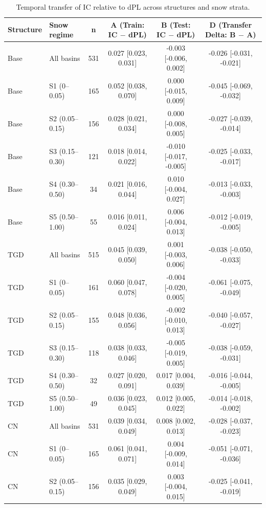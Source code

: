 \begin{table}[t]
\centering
\caption{Temporal transfer of IC relative to dPL across structures and snow strata.}
\label{tab:s3_ic_dpl_temporal_transfer}
\begin{threeparttable}
\begin{tabular}{llcccc}
\toprule
Structure & Snow regime & n & A (Train: IC $-$ dPL) & B (Test: IC $-$ dPL) & D (Transfer Delta: B $-$ A) \\
\midrule
Base & All basins & 531 & 0.027 [0.023, 0.031] & -0.003 [-0.006, 0.002] & -0.026 [-0.031, -0.021] \\
Base & S1 (0–0.05) & 165 & 0.052 [0.038, 0.070] & 0.000 [-0.015, 0.009] & -0.045 [-0.069, -0.032] \\
Base & S2 (0.05–0.15) & 156 & 0.028 [0.021, 0.034] & 0.000 [-0.008, 0.005] & -0.027 [-0.039, -0.014] \\
Base & S3 (0.15–0.30) & 121 & 0.018 [0.014, 0.022] & -0.010 [-0.017, -0.005] & -0.025 [-0.033, -0.017] \\
Base & S4 (0.30–0.50) & 34 & 0.021 [0.016, 0.044] & 0.010 [-0.004, 0.027] & -0.013 [-0.033, -0.003] \\
Base & S5 (0.50–1.00) & 55 & 0.016 [0.011, 0.024] & 0.006 [-0.004, 0.013] & -0.012 [-0.019, -0.005] \\
TGD & All basins & 515 & 0.045 [0.039, 0.050] & 0.001 [-0.003, 0.006] & -0.038 [-0.050, -0.033] \\
TGD & S1 (0–0.05) & 161 & 0.060 [0.047, 0.078] & -0.004 [-0.020, 0.005] & -0.061 [-0.075, -0.049] \\
TGD & S2 (0.05–0.15) & 155 & 0.048 [0.036, 0.056] & -0.002 [-0.010, 0.013] & -0.040 [-0.057, -0.027] \\
TGD & S3 (0.15–0.30) & 118 & 0.038 [0.033, 0.046] & -0.005 [-0.019, 0.005] & -0.038 [-0.059, -0.031] \\
TGD & S4 (0.30–0.50) & 32 & 0.027 [0.020, 0.091] & 0.017 [0.004, 0.039] & -0.016 [-0.044, -0.005] \\
TGD & S5 (0.50–1.00) & 49 & 0.036 [0.023, 0.045] & 0.012 [0.005, 0.022] & -0.014 [-0.018, -0.002] \\
CN & All basins & 531 & 0.039 [0.034, 0.049] & 0.008 [0.002, 0.013] & -0.028 [-0.037, -0.023] \\
CN & S1 (0–0.05) & 165 & 0.061 [0.041, 0.071] & 0.004 [-0.009, 0.014] & -0.051 [-0.071, -0.036] \\
CN & S2 (0.05–0.15) & 156 & 0.035 [0.029, 0.049] & 0.003 [-0.004, 0.015] & -0.025 [-0.041, -0.019] \\

\end{tabular}
\end{threeparttable}
\end{table}
